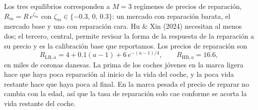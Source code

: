 \documentclass{article}
\begin{document}
Los tres equilibrios corresponden a $M=3$ regímenes de precios de reparación, $R_m=R\,e^{\zeta_m}$ con $\zeta_m\in\{-0.3,\,0,\,0.3\}$: un mercado con reparación barata, el mercado base y uno con reparación cara. Hu \& Xin (2024) necesitan al menos dos; el tercero, central, permite revisar la forma de la respuesta de la reparación a su precio y es la calibración base que reportamos. Los precios de reparación son
$$R_{\text{LB},a}=4+0.1(a-1)+6\,e^{-(a-1)/4},\qquad R_{\text{HB},a}=16.6,$$
en miles de coronas danesas. La prima de los coches jóvenes en la marca ligera hace que haya poca reparación al inicio de la vida del coche, y la poca vida restante hace que haya poca al final. En la marca pesada el precio de reparar no cambia con la edad, así que la tasa de reparación solo cae conforme se acorta la vida restante del coche.
\end{document}
